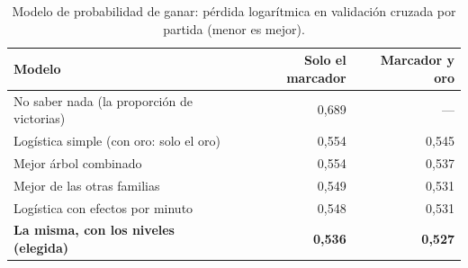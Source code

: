 \begin{table}[H]
\centering\small
\caption{Modelo de probabilidad de ganar: pérdida logarítmica en validación cruzada por partida (menor es mejor).}
\label{tab:probabilidad}
\begin{tabular}{lrr}
\toprule
Modelo & Solo el marcador & Marcador y oro \\
\midrule
No saber nada (la proporción de victorias) & 0{,}689 & — \\
Logística simple (con oro: solo el oro) & 0{,}554 & 0{,}545 \\
Mejor árbol combinado & 0{,}554 & 0{,}537 \\
Mejor de las otras familias & 0{,}549 & 0{,}531 \\
Logística con efectos por minuto & 0{,}548 & 0{,}531 \\
\textbf{La misma, con los niveles (elegida)} & \textbf{0{,}536} & \textbf{0{,}527} \\
\bottomrule
\end{tabular}
\end{table}
